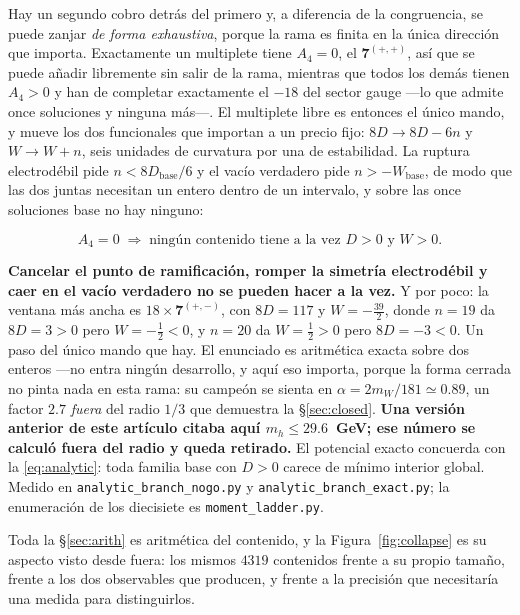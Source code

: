 \documentclass[11pt,a4paper]{article}
\newcommand{\rep}[1]{\mathbf{#1}}
\newenvironment{keyeq}
  {\begin{center}\setlength{\fboxsep}{9pt}\setlength{\fboxrule}{0.8pt}%
   \begin{lrbox}{\keyeqbox}\begin{minipage}{0.88\textwidth}}
  {\end{minipage}\end{lrbox}%
   \fcolorbox{hdrblue!55}{hdrblue!6}{\usebox{\keyeqbox}}\end{center}}
\begin{document}
Hay un segundo cobro detrás del primero y, a diferencia de la congruencia, se puede zanjar
\emph{de forma exhaustiva}, porque la rama es finita en la única dirección que importa. Exactamente
un multiplete tiene $A_4=0$, el $\rep7^{(+,+)}$, así que se puede añadir libremente sin salir de la
rama, mientras que todos los demás tienen $A_4>0$ y han de completar exactamente el $-18$ del sector
gauge ---lo que admite once soluciones y ninguna más---. El multiplete libre es entonces el único
mando, y mueve los dos funcionales que importan a un precio fijo: $8D\to8D-6n$ y $W\to W+n$, seis
unidades de curvatura por una de estabilidad. La ruptura electrodébil pide $n<8D_{\text{base}}/6$ y
el vacío verdadero pide $n>-W_{\text{base}}$, de modo que las dos juntas necesitan un entero dentro
de un intervalo, y sobre las once soluciones base no hay ninguno:
\begin{keyeq}
\begin{equation}\label{eq:analytic}
  A_4=0\;\Longrightarrow\;\text{ningún contenido tiene a la vez } D>0 \text{ y } W>0 .
\end{equation}
\end{keyeq}
\noindent \textbf{Cancelar el punto de ramificación, romper la simetría electrodébil y caer en el
vacío verdadero no se pueden hacer a la vez.} Y por poco: la ventana más ancha es
$18\times\rep7^{(+,-)}$, con $8D=117$ y $W=-\tfrac{39}{2}$, donde $n=19$ da $8D=3>0$ pero
$W=-\tfrac12<0$, y $n=20$ da $W=\tfrac12>0$ pero $8D=-3<0$. Un paso del único mando que hay. El
enunciado es aritmética exacta sobre dos enteros ---no entra ningún desarrollo, y aquí eso importa,
porque la forma cerrada no pinta nada en esta rama: su campeón se sienta en
$\alpha=2m_W/181\simeq0.89$, un factor $2.7$ \emph{fuera} del radio $1/3$ que demuestra la
\S\ref{sec:closed}. \textbf{Una versión anterior de este artículo citaba aquí $m_h\le29.6$~GeV; ese
número se calculó fuera del radio y queda retirado.} El potencial exacto concuerda con la
\eqref{eq:analytic}: toda familia base con $D>0$ carece de mínimo interior global. Medido en
\texttt{analytic\_\allowbreak branch\_\allowbreak nogo.py} y
\texttt{analytic\_\allowbreak branch\_\allowbreak exact.py}; la enumeración de los diecisiete es
\texttt{moment\_\allowbreak ladder.py}.

Toda la \S\ref{sec:arith} es aritmética del contenido, y la Figura~\ref{fig:collapse} es su aspecto
visto desde fuera: los mismos $4319$ contenidos frente a su propio tamaño, frente a los dos
observables que producen, y frente a la precisión que necesitaría una medida para distinguirlos.
\end{document}
